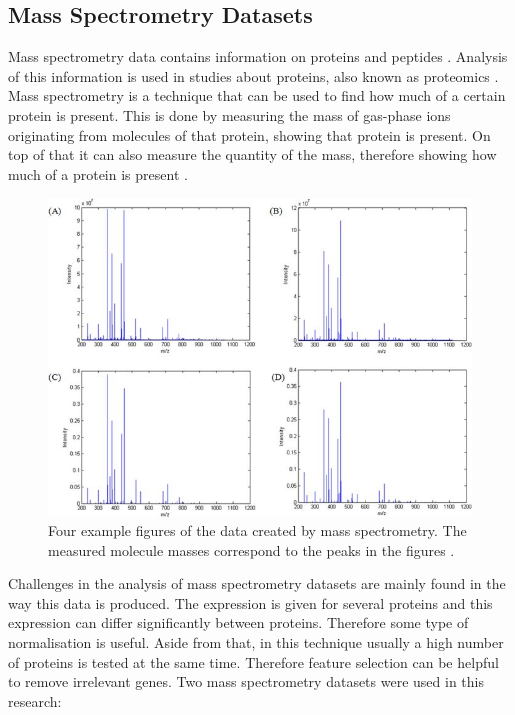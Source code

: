 \documentclass[10pt,a4paper]{report}
\begin{document}
	\subsection{Mass Spectrometry Datasets}
	\label{PLsubsec:MassSpect}
	
	Mass spectrometry data contains information on proteins and peptides \cite{cottrell1999probability, dettmer2007mass}. Analysis of this information is used in studies about proteins, also known as proteomics \cite{matthiesen2008analysis}. Mass spectrometry is a technique that can be used to find how much of a certain protein is present. This is done by measuring the mass of gas-phase ions originating from molecules of that protein, showing that protein is present. On top of that it can also measure the quantity of the mass, therefore showing how much of a protein is present \cite{watson2007introduction}.
	
	\begin{figure}
		\includegraphics[width=\textwidth]{MassSpect.jpg}
		\caption{Four example figures of the data created by mass spectrometry. The measured molecule masses correspond to the peaks in the figures \cite{neves2018mass}.}
		\label{fig:MassSpect}
	\end{figure}
	
	
	Challenges in the analysis of mass spectrometry datasets are mainly found in the way this data is produced. The expression is given for several proteins and this expression can differ significantly between proteins. Therefore some type of normalisation is useful. Aside from that, in this technique usually a high number of proteins is tested at the same time. Therefore feature selection can be helpful to remove irrelevant genes. Two mass spectrometry datasets were used in this research:
\end{document}
